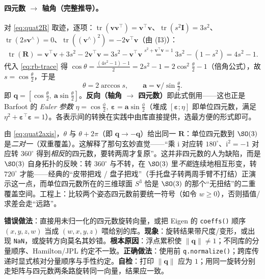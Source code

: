 \paragraph{四元数 $\to$ 轴角（完整推导）。}对 \cref{eq:quat2R} 取迹，逐项：$\operatorname{tr}(\mathbf{v}\mathbf{v}^\top)=\mathbf{v}^\top\mathbf{v}$、$\operatorname{tr}(s^2\mathbf{I})=3s^2$、$\operatorname{tr}(2s\mathbf{v}^\wedge)=0$、$\operatorname{tr}((\mathbf{v}^\wedge)^2)=-2\mathbf{v}^\top\mathbf{v}$（由 (I3)）：
\begin{equation}
  \operatorname{tr}(\mathbf{R})=\mathbf{v}^\top\mathbf{v}+3s^2-2\mathbf{v}^\top\mathbf{v}=3s^2-\mathbf{v}^\top\mathbf{v}\overset{s^2+\mathbf{v}^\top\mathbf{v}=1}{=}3s^2-(1-s^2)=4s^2-1.
\end{equation}
代入 \cref{eq:rb-trace} 得 $\cos\theta=\frac{(4s^2-1)-1}{2}=2s^2-1=2\cos^2\tfrac{\theta}{2}-1$（倍角公式），故 $s=\cos\tfrac{\theta}{2}$，于是
\begin{equation}
  \theta=2\arccos s,\qquad \mathbf{a}=\mathbf{v}\big/\sin\tfrac{\theta}{2}.
  \label{eq:quat2axis}
\end{equation}
即 $\mathbf{q}=[\cos\tfrac{\theta}{2},\ \mathbf{a}\sin\tfrac{\theta}{2}]$。\textbf{反向（轴角 $\to$ 四元数）}即此式倒用——这也正是 Barfoot 的 \emph{Euler 参数} $\eta=\cos\tfrac{\phi}{2},\ \boldsymbol{\varepsilon}=\mathbf{a}\sin\tfrac{\phi}{2}$（堆成 $[\boldsymbol{\varepsilon};\eta]$ 即单位四元数，满足 $\eta^2+\boldsymbol{\varepsilon}^\top\boldsymbol{\varepsilon}=1$）\cite{barfoot2024state}。各表示间的转换在实践中由库直接提供，选最方便的形式即可。

\begin{insight}
由 \cref{eq:quat2axis}，$\theta$ 与 $\theta+2\pi$（即 $\mathbf{q}\to-\mathbf{q}$）给出同一 $\mathbf{R}$：单位四元数到 $\SO(3)$ 是\emph{二对一}（双重覆盖）。这解释了那句玄妙直觉——“乘 $\mathrm{i}$ 对应转 $180^\circ$、$\mathrm{i}^2=-1$ 对应转 $360^\circ$ 得到\emph{相反}的四元数，要转两周才复原”\cite{gaoxiang2019slam14}。这并非四元数的人为缺陷，而是 $\SO(3)$ 自身拓扑的反映：转 $360^\circ$ 与不转，在 $\SO(3)$ 里\emph{不能}连续地相互形变，转 $720^\circ$ 才能——经典的“皮带把戏 / 盘子把戏”（手托盘子转两周手臂不打结）正演示这一点，而单位四元数所在的三维球面 $S^3$ 恰是 $\SO(3)$ 的那个“无扭结”的二重覆盖空间\cite{hanson2006visualizing}。工程上：比较两个姿态四元数前要统一符号（如令 $w\ge0$），否则插值/求差会走“远路”。
\end{insight}

\begin{pitfall}
\textbf{错误做法}：直接用未归一化的四元数旋转向量，或把 Eigen 的 \texttt{coeffs()} 顺序 $(x,y,z,w)$ 当成 $(w,x,y,z)$ 喂给别的库。\textbf{现象}：旋转结果带尺度/变形，或出现 \texttt{NaN}，或旋转方向莫名其妙错。\textbf{根本原因}：浮点累积使 $\|\mathbf{q}\|\neq1$；不同库的分量顺序、Hamilton/JPL 约定不一致。\textbf{正确做法}：使用前 \texttt{q.normalize()}；跨库传递时显式核对分量顺序与手性约定。\textbf{自检}：打印 $\|\mathbf{q}\|$ 应为 $1$；用同一旋转分别走矩阵与四元数两条路旋转同一向量，结果应一致。
\end{pitfall}

